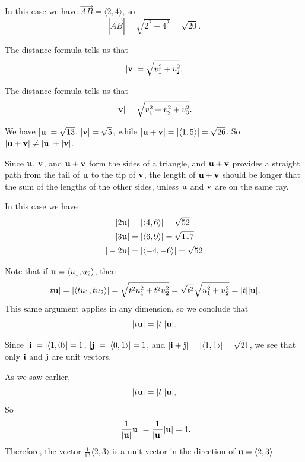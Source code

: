 \begin{activitySolution}
\ba
	\item In this case we have $\overrightarrow{AB} = \langle 2,4\rangle$, so 
\[|\overrightarrow{AB}|  = \sqrt{2^2+4^2} = \sqrt{20}.\]
	\item The distance formula tells us that 
\[|\mathbf{v}| = \sqrt{v_1^2 + v_2^2}.\]
	\item The distance formula tells us that 
\[|\mathbf{v}| = \sqrt{v_1^2 + v_2^2+v_3^2}.\]
    \item We have $|\mathbf{u}| = \sqrt{13}$, $|\mathbf{v}| = \sqrt{5}$, while $|\mathbf{u}+\mathbf{v}| = |\langle 1,5\rangle| = \sqrt{26}$. So $|\mathbf{u} + \mathbf{v}| \neq |\mathbf{u}|+|\mathbf{v}|$.
    \item Since $\mathbf{u}$, $\mathbf{v}$, and $\mathbf{u}+\mathbf{v}$ form the sides of a triangle, and $\mathbf{u}+\mathbf{v}$ provides a straight path from the tail of $\mathbf{u}$ to the tip of $\mathbf{v}$, the length of $\mathbf{u}+\mathbf{v}$ should be longer that the sum of the lengths of the other sides, unless $\mathbf{u}$ and $\mathbf{v}$ are on the same ray. 
     \item In this case we have 
\begin{align*}
|2\mathbf{u}| &= |\langle 4,6 \rangle | = \sqrt{52} \\
|3\mathbf{u}| &= |\langle 6,9 \rangle | = \sqrt{117} \\
|-2\mathbf{u}| &= |\langle -4,-6 \rangle | = \sqrt{52} \\
\end{align*}
    \item Note that if $\mathbf{u} = \langle u_1, u_2\rangle$, then 
\[|t\mathbf{u}| = |\langle tu_1, tu_2 \rangle | = \sqrt{t^2u_1^2 + t^2u_2^2} = \sqrt{t^2}\sqrt{u_1^2+u_2^2} = |t||\mathbf{u}|.\]
This same argument applies in any dimension, so we conclude that 
\[|t\mathbf{u}| = |t||\mathbf{u}|.\]
    \item Since $|{\bf i}| = |\langle 1,0 \rangle | = 1$, $|{\bf j}| = |\langle 0,1 \rangle | = 1$, and $|{\bf i }+ {\bf j}| = |\langle 1,1 \rangle | = \sqrt{2}1$, we see that only ${\bf i}$ and ${\bf j}$ are unit vectors. 
     \item As we saw earlier, 
\[|t\mathbf{u}| = |t||\mathbf{u}|,\]
So 
\[\left| \frac{1}{|\mathbf{u}|} \mathbf{u} \right| = \frac{1}{|\mathbf{u}|} |\mathbf{u}| = 1.\]
Therefore, the vector $\frac{1}{13} \langle 2,3\rangle$ is a unit vector in the direction of $\mathbf{u} = \langle 2, 3\rangle$.
	\ea
\end{activitySolution}
\aftera
